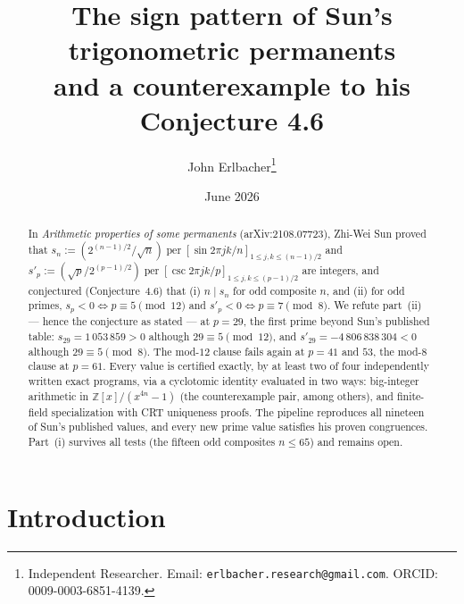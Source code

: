 \documentclass[10pt]{article}
\title{The sign pattern of Sun's trigonometric permanents\\
and a counterexample to his Conjecture 4.6}
\author{John Erlbacher\thanks{Independent Researcher. Email: \texttt{erlbacher.research@gmail.com}. ORCID: 0009-0003-6851-4139.}}
\date{June 2026}
\theoremstyle{remark}
\DeclareMathOperator{\per}{per}
\newcommand{\Z}{\mathbb{Z}}
\begin{document}
\maketitle

\begin{abstract}
In \emph{Arithmetic properties of some permanents} (arXiv:2108.07723),
Zhi-Wei Sun proved that
$s_n := (2^{(n-1)/2}/\sqrt n)\per[\sin 2\pi jk/n]_{1\le j,k\le(n-1)/2}$ and
$s'_p := (\sqrt p/2^{(p-1)/2})\per[\csc 2\pi jk/p]_{1\le j,k\le(p-1)/2}$ are
integers, and conjectured (Conjecture~4.6) that (i) $n \mid s_n$ for odd
composite $n$, and (ii) for odd primes, $s_p<0 \iff p\equiv 5 \pmod{12}$ and
$s'_p<0 \iff p\equiv 7\pmod 8$. We refute part~(ii) --- hence the conjecture
as stated --- at $p=29$, the first prime beyond Sun's published table:
$s_{29}=1\,053\,859>0$ although $29\equiv 5\pmod{12}$, and
$s'_{29}=-4\,806\,838\,304<0$ although $29\equiv 5\pmod 8$. The mod-$12$
clause fails again at $p=41$ and $53$, the mod-$8$ clause at $p=61$. Every
value is certified exactly, by at least two of four independently written
exact programs, via a cyclotomic identity evaluated in two ways:
big-integer arithmetic in $\Z[x]/(x^{4n}-1)$ (the counterexample pair,
among others), and finite-field specialization with CRT uniqueness
proofs. The pipeline reproduces all nineteen of Sun's
published values, and every new prime value satisfies his proven
congruences.
Part~(i) survives all tests (the fifteen odd composites $n\le 65$) and
remains open.
\end{abstract}

\section{Introduction}\label{sec:intro}
\end{document}
